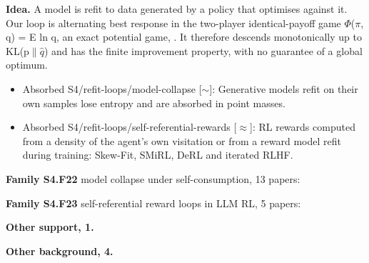 \documentclass[10pt]{article}
\newcommand{\memb}[1]{\par\smallskip\textbf{#1}\quad}
\begin{document}
\textbf{Idea.} A model is refit to data generated by a policy that optimises against it. Our loop is alternating best response in the two-player identical-payoff game \ensuremath{\Phi}(\ensuremath{\pi}, q) = E ln q, an exact potential game, \citet{Monderer-potential96}. It therefore descends monotonically up to KL(p\ensuremath{\|}\ensuremath{\hat{q}}) and has the finite improvement property, with no guarantee of a global optimum.
\begin{itemize}[nosep,leftmargin=1.2em]
\item Absorbed S4/refit-loops/model-collapse [\ensuremath{\sim}]: Generative models refit on their own samples lose entropy and are absorbed in point masses.
\item Absorbed S4/refit-loops/self-referential-rewards [\ensuremath{\approx}]: RL rewards computed from a density of the agent's own visitation or from a reward model refit during training: Skew-Fit, SMiRL, DeRL and iterated RLHF.
\end{itemize}


\memb{Family S4.F22} model collapse under self-consumption, 13 papers: {\footnotesize \citetext{\citealp{Shumailov-curse23}; \citealp{Bertrand-stability23}; \citealp{Barzilai-when25}; \citealp{Chen-entropyreservoir25}; \citealp{Alemohammad-selfconsuming23}; \citealp{Dey-universality24}; \citealp{Dohmatob-model24}; \citealp{Gerstgrasser-model24}; \citealp{Gillman-selfcorrecting24}; \citealp{Fu-theoretical25}; \citealp{Kanabar-model25}; \citealp{Suresh-rate24}; \citealp{Liu-oligarch26}}}

\memb{Family S4.F23} self-referential reward loops in LLM RL, 5 papers: {\footnotesize \citetext{\citealp{Cui-entropy25}; \citealp{Gauthier-explaining26}; \citealp{Pan-feedback24}; \citealp{Tan-breaking25}; \citealp{Wolf-reward25}}}

\memb{Other support, 1.} \citetext{\citealp{Monderer-potential96}}

\memb{Other background, 4.} {\footnotesize \citetext{\citealp{Robinson-iterative51}; \citealp{Ensign-runaway17}; \citealp{Taori-data22}; \citealp{Schafer-decoupled22}}}
\end{document}
